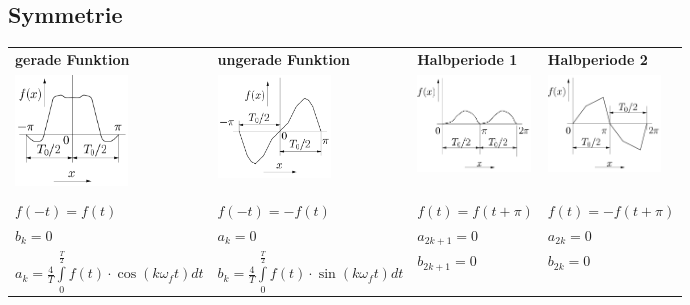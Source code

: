 \subsection{Symmetrie}
\begin{tabular}{|p{4.3cm}|p{4.3cm}|p{4.3cm}|p{4.3cm}|}
  \hline
 	\textbf{gerade Funktion} & \textbf{ungerade Funktion} &
 	\textbf{Halbperiode 1} & \textbf{Halbperiode 2}\\
 	\includegraphics[width=3cm]{content/appendix/geradeFunktion.png}&
 	\includegraphics[width=3cm]{content/appendix/ungeradeFunktion.png}&   
  \includegraphics[width=3cm]{content/appendix/halbperiode1.png}&   
  \includegraphics[width=3cm]{content/appendix/halbperiode2.png}\\
	& & & \\			
	$f(-t)=f(t)$ & $f(-t)=-f(t)$ & $f(t)=f(t+\pi)$ & $f(t)=-f(t+\pi)$\\
	$b_k=0$ & $a_k=0$ & $a_{2k+1}=0$ & $a_{2k}=0$\\
	$a_k = \frac{4}{T} \int\limits_0^{\frac{T}{2}} f(t) \cdot \cos(k \omega_f
	t) dt$ &
	$b_k =  \frac{4}{T} \int\limits_0^{\frac{T}{2}} f(t) \cdot
  \sin(k \omega_f t) dt$ &
	$b_{2k+1}=0$ & $b_{2k}=0$\\
	\hline
\end{tabular} 
    
